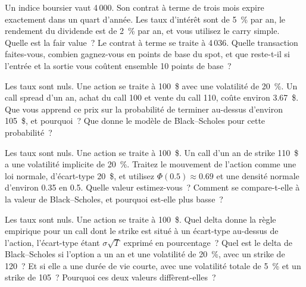 \begin{question}\label{iq:iv2:options-and-bond-arithmetic-at-speed:19}
Un indice boursier vaut 4\,000. Son contrat à terme de trois mois expire exactement dans un quart d'année. Les taux d'intérêt sont de 5~\% par an, le rendement du dividende est de 2~\% par an, et vous utilisez le carry simple. Quelle est la fair value~? Le contrat à terme se traite à 4\,036. Quelle transaction faites-vous, combien gagnez-vous en points de base du spot, et que reste-t-il si l'entrée et la sortie vous coûtent ensemble 10 points de base~?
\end{question}

\begin{question}\label{iq:iv2:options-and-bond-arithmetic-at-speed:20}
Les taux sont nuls. Une action se traite à 100~\$ avec une volatilité de 20~\%. Un call spread d'un an, achat du call 100 et vente du call 110, coûte environ 3.67~\$. Que vous apprend ce prix sur la probabilité de terminer au-dessus d'environ 105~\$, et pourquoi~? Que donne le modèle de Black--Scholes pour cette probabilité~?
\end{question}

\begin{question}\label{iq:iv2:options-and-bond-arithmetic-at-speed:21}
Les taux sont nuls. Une action se traite à 100~\$. Un call d'un an de strike 110~\$ a une volatilité implicite de 20~\%. Traitez le mouvement de l'action comme une loi normale, d'écart-type 20~\$, et utilisez $\Phi(0.5) \approx 0.69$ et une densité normale d'environ 0.35 en 0.5. Quelle valeur estimez-vous~? Comment se compare-t-elle à la valeur de Black--Scholes, et pourquoi est-elle plus basse~?
\end{question}

\begin{question}\label{iq:iv2:options-and-bond-arithmetic-at-speed:22}
Les taux sont nuls. Une action se traite à 100~\$. Quel delta donne la règle empirique pour un call dont le strike est situé à un écart-type au-dessus de l'action, l'écart-type étant $\sigma\sqrt{T}$ exprimé en pourcentage~? Quel est le delta de Black--Scholes si l'option a un an et une volatilité de 20~\%, avec un strike de 120~? Et si elle a une durée de vie courte, avec une volatilité totale de 5~\% et un strike de 105~? Pourquoi ces deux valeurs diffèrent-elles~?
\end{question}

